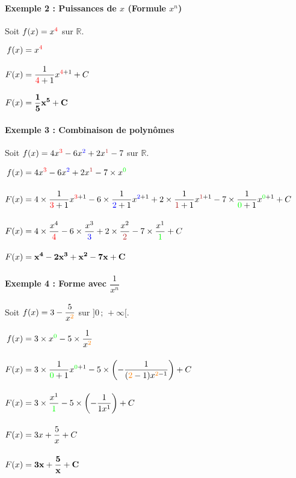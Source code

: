 \documentclass[12pt,a4paper]{article}
\begin{document}
\vspace{0.3cm}

\paragraph{Exemple 2 : Puissances de $x$ (Formule $x^n$)}
Soit $f(x) = x^{\color{red}4}$ sur $\mathbb{R}$.

$
\begin{aligned}
f(x) &= x^{\color{red}4}\\[3mm]
F(x) &= \dfrac{1}{{\color{red}4}+1} x^{{\color{red}4}+1} + C\\[3mm]
F(x) &= \mathbf{\frac{1}{5}x^5 + C}
\end{aligned}
$

\vspace{0.3cm}

\paragraph{Exemple 3 : Combinaison de polynômes}
Soit $f(x) = 4x^{\color{red}3} - 6x^{\color{blue}2} + 2x^{\color{myred}1} - 7$ sur $\mathbb{R}$.

$
\begin{aligned}
f(x) &= 4x^{\color{red}3} - 6x^{\color{blue}2} + 2x^{\color{myred}1} - 7 \times x^{\color{green}0}\\[4mm]
F(x) &= 4 \times \dfrac{1}{{\color{red}3}+1} x^{{\color{red}3}+1} - 6 \times \dfrac{1}{{\color{blue}2}+1} x^{{\color{blue}2}+1} + 2 \times \dfrac{1}{{\color{myred}1}+1} x^{{\color{myred}1}+1} - 7 \times \dfrac{1}{{\color{green}0}+1} x^{{\color{green}0}+1} + C\\[4mm]
F(x) &= 4 \times \frac{x^4}{{\color{red}4}} - 6 \times \frac{x^3}{{\color{blue}3}} + 2 \times \frac{x^2}{{\color{myred}2}} - 7 \times \frac{x^1}{{\color{green}1}} + C\\[4mm]
F(x) &= \mathbf{x^4 - 2x^3 + x^2 - 7x + C}
\end{aligned}
$

\vspace{0.3cm}

\paragraph{Exemple 4 : Forme avec $\dfrac{1}{x^n}$}
Soit $f(x) = 3 - \dfrac{5}{x^{\color{orange}2}}$ sur $]0 \,;\, +\infty[$.

$
\begin{aligned}
f(x) &= 3 \times x^{\color{green}0} - 5 \times \frac{1}{x^{\color{orange}2}}\\[4mm]
F(x) &= 3 \times \dfrac{1}{{\color{green}0}+1} x^{{\color{green}0}+1} - 5 \times \left(-\dfrac{1}{({\color{orange}2}-1)x^{{\color{orange}2}-1}}\right) + C\\[4mm]
F(x) &= 3 \times \frac{x^1}{{\color{green}1}} - 5 \times \left(-\frac{1}{1x^1}\right) + C\\[4mm]
F(x) &= 3x + \frac{5}{x} + C\\[4mm]
F(x) &= \mathbf{3x + \frac{5}{x} + C}
\end{aligned}
$
\end{document}
